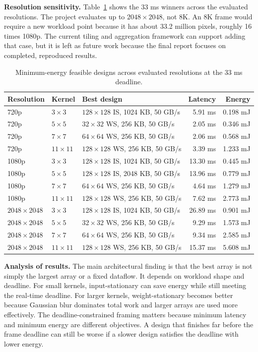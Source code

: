 \documentclass[12pt]{article}
\begin{document}
\textbf{Resolution sensitivity.} Table~\ref{tab:resolution} shows the 33 ms winners across the evaluated resolutions. The project evaluates up to $2048\times2048$, not 8K. An 8K frame would require a new workload point because it has about 33.2 million pixels, roughly 16 times 1080p. The current tiling and aggregation framework can support adding that case, but it is left as future work because the final report focuses on completed, reproduced results.

\begin{table}[H]
\centering
\scriptsize
\caption{Minimum-energy feasible designs across evaluated resolutions at the 33 ms deadline.}
\label{tab:resolution}
\begin{tabular}{l l l r r}
\toprule
Resolution & Kernel & Best design & Latency & Energy \\
\midrule
720p & $3\times3$ & $128\times128$ IS, 1024 KB, 50 GB/s & 5.91 ms & 0.198 mJ \\
720p & $5\times5$ & $32\times32$ WS, 256 KB, 50 GB/s & 2.05 ms & 0.346 mJ \\
720p & $7\times7$ & $64\times64$ WS, 256 KB, 50 GB/s & 2.06 ms & 0.568 mJ \\
720p & $11\times11$ & $128\times128$ WS, 256 KB, 50 GB/s & 3.39 ms & 1.233 mJ \\
1080p & $3\times3$ & $128\times128$ IS, 1024 KB, 50 GB/s & 13.30 ms & 0.445 mJ \\
1080p & $5\times5$ & $128\times128$ IS, 2048 KB, 50 GB/s & 13.96 ms & 0.779 mJ \\
1080p & $7\times7$ & $64\times64$ WS, 256 KB, 50 GB/s & 4.64 ms & 1.279 mJ \\
1080p & $11\times11$ & $128\times128$ WS, 256 KB, 50 GB/s & 7.62 ms & 2.773 mJ \\
$2048\times2048$ & $3\times3$ & $128\times128$ IS, 1024 KB, 50 GB/s & 26.89 ms & 0.901 mJ \\
$2048\times2048$ & $5\times5$ & $32\times32$ WS, 256 KB, 50 GB/s & 9.29 ms & 1.573 mJ \\
$2048\times2048$ & $7\times7$ & $64\times64$ WS, 256 KB, 50 GB/s & 9.34 ms & 2.585 mJ \\
$2048\times2048$ & $11\times11$ & $128\times128$ WS, 256 KB, 50 GB/s & 15.37 ms & 5.608 mJ \\
\bottomrule
\end{tabular}
\end{table}

\textbf{Analysis of results.} The main architectural finding is that the best array is not simply the largest array or a fixed dataflow. It depends on workload shape and deadline. For small kernels, input-stationary can save energy while still meeting the real-time deadline. For larger kernels, weight-stationary becomes better because Gaussian blur dominates total work and larger arrays are used more effectively. The deadline-constrained framing matters because minimum latency and minimum energy are different objectives. A design that finishes far before the frame deadline can still be worse if a slower design satisfies the deadline with lower energy.
\end{document}
